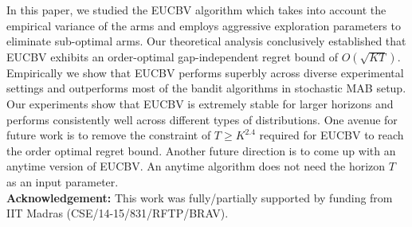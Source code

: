 In this paper, we studied the EUCBV algorithm which takes into account the empirical variance of the arms and employs aggressive exploration parameters to eliminate sub-optimal arms. Our theoretical analysis conclusively established that EUCBV exhibits an order-optimal gap-independent regret bound of $O\left(\sqrt{KT}\right)$. Empirically we show that EUCBV performs superbly across diverse experimental settings and outperforms most of the bandit algorithms in stochastic  MAB setup. Our experiments show that EUCBV is extremely stable for larger horizons and performs consistently well across different types of distributions. One avenue for future work is to remove the constraint of $T\geq K^{2.4}$ required for EUCBV to reach the order optimal regret bound. Another future direction is to come up with an anytime version of EUCBV. An anytime algorithm does not need the horizon $T$ as an input parameter. \\
\textbf{Acknowledgement:} This work was fully/partially supported by funding from IIT Madras (CSE/14-15/831/RFTP/BRAV).